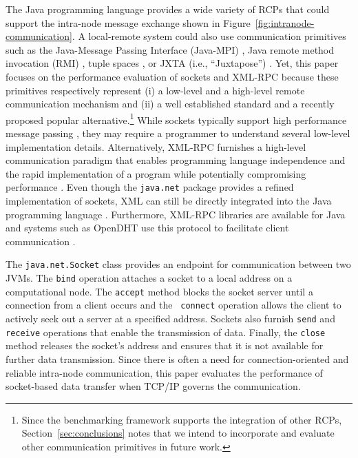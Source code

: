 \documentclass{sig-alternate}
\begin{document}
The Java programming language provides a wide variety of RCPs that
could support the intra-node message exchange shown in
Figure~\ref{fig:intranode-communication}.  A local-remote system could
also use communication primitives such as the Java-Message Passing
Interface (Java-MPI) \cite{getov-mpi,judd-mpi-java}, Java remote
method invocation (RMI) \cite{grosso-rmi,maasen-java-rmi}, tuple
spaces \cite{arnold-javaspace-rdb,wells-linda-java-journal}, or JXTA
(i.e., ``Juxtapose'') \cite{oaks-jxta,seigneur-jxta}.  Yet, this paper
focuses on the performance evaluation of sockets and XML-RPC because
these primitives respectively represent (i) a low-level and a
high-level remote communication mechanism and (ii) a well established
standard and a recently proposed popular alternative.\footnote{{\small
    Since the benchmarking framework supports the integration of other
    RCPs, Section~\ref{sec:conclusions} notes that we intend to
  incorporate and evaluate other communication primitives in future
  work.}} While sockets typically support high performance message
  passing \cite{allman-per}, they may require a programmer to
  understand several low-level implementation details.  Alternatively,
  XML-RPC furnishes a high-level communication paradigm that enables
  programming language independence and the rapid implementation of a
  program while potentially compromising performance
  \cite{allman-per}.  Even though the {\tt java.net} package provides
  a refined implementation of sockets, XML can still be directly
  integrated into the Java programming language \cite{harren-xj}.
  Furthermore, XML-RPC libraries are available for Java and systems
  such as OpenDHT use this protocol to facilitate client communication
  \cite{rhea-opendht}.

The {\tt java.net.Socket} class provides an endpoint for communication
between two JVMs.  The {\tt bind} operation attaches a socket to a
local address on a computational node.  The {\tt accept} method blocks
the socket server until a connection from a client occurs and the {\tt
  connect} operation allows the client to actively seek out a server
at a specified address.  Sockets also furnish {\tt send} and {\tt
  receive} operations that enable the transmission of data.  Finally,
the {\tt close} method releases the socket's address and ensures that
it is not available for further data transmission.  Since there is
often a need for connection-oriented and reliable intra-node
communication, this paper evaluates the performance of socket-based
data transfer when TCP/IP governs the communication.
\end{document}
